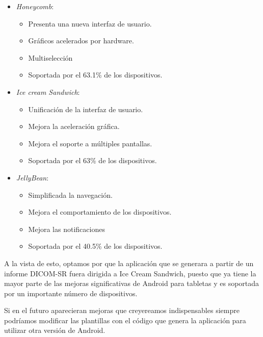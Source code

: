 \begin{itemize}
  \item \emph{Honeycomb}:
    \begin{itemize} 
      \item Presenta una nueva interfaz de usuario.
      \item Gráficos acelerados por hardware.
      \item Multiselección
      \item Soportada por el 63.1\% de los dispositivos.
    \end{itemize}
    \item \emph{Ice cream Sandwich}:
    \begin{itemize} 
      \item Unificación de la interfaz de usuario.
      \item Mejora la aceleración gráfica.
      \item Mejora el soporte a múltiples pantallas. 
      \item Soportada por el 63\% de los dispositivos.
    \end{itemize}
  \item \emph{JellyBean}:
    \begin{itemize} 
      \item Simplificada la navegación.
      \item Mejora el comportamiento de los dispositivos.
      \item Mejora las notificaciones
      \item Soportada por el 40.5\% de los dispositivos.
    \end{itemize}
\end{itemize}
A la vista de esto, optamos por que la aplicación que se generara a partir de un informe DICOM-SR fuera dirigida a Ice Cream Sandwich, puesto que ya tiene la mayor parte de las mejoras significativas de Android para tabletas y es soportada por un importante número de dispositivos.\par
Si en el futuro aparecieran mejoras que creyereamos indispensables siempre podríamos modificar las plantillas con el código  que genera la aplicación para utilizar otra versión de Android.\par


